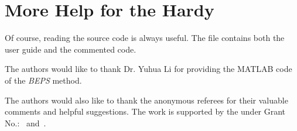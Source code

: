 \section{More Help for the Hardy}

Of course, reading the source code is always useful.  The file
 contains both the user guide and the commented
code.

\begin{acks}
  The authors would like to thank Dr. Yuhua Li for providing the
  MATLAB code of the \textit{BEPS} method.

  The authors would also like to thank the anonymous referees for
  their valuable comments and helpful suggestions. The work is
  supported by the  under Grant
  No.:~
  and~.

\end{acks}

